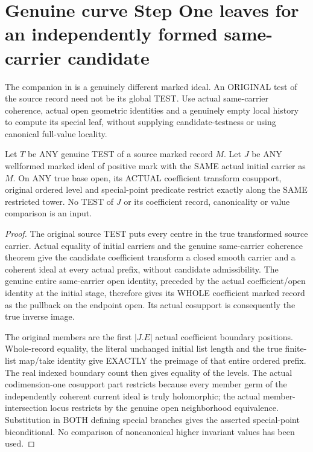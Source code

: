 \section{Genuine curve Step One leaves for an independently formed same-carrier candidate}

The companion in \cite[Section~5, Step~II.B]{bierstone-milman08-functoriality}
is a genuinely different marked ideal. An ORIGINAL test of the source
record need not be its global TEST. Use actual same-carrier coherence,
actual open geometric identities and a genuinely empty local history to
compute its special leaf, without supplying candidate-testness or using
canonical full-value locality.

\begin{lemma}
\label{hir:original-same-carrier-coefficient-special-open-geometry}
\leanok
Let $T$ be ANY genuine TEST of a source marked record $M$. Let $J$ be
ANY wellformed marked ideal of positive mark with the SAME actual initial
carrier as $M$. On ANY true base open, its ACTUAL coefficient transform
cosupport, original ordered level and special-point predicate restrict
exactly along the SAME restricted tower. No TEST of $J$ or its coefficient
record, canonicality or value comparison is an input.
\end{lemma}
\begin{proof}
The original source TEST puts every centre in the true transformed source
carrier. Actual equality of initial carriers and the genuine same-carrier
coherence theorem give the candidate coefficient transform a closed smooth
carrier and a coherent ideal at every actual prefix, without candidate
admissibility. The genuine entire same-carrier open identity, preceded by
the actual coefficient/open identity at the initial stage, therefore gives
its WHOLE coefficient marked record as the pullback on the endpoint open.
Its actual cosupport is consequently the true inverse image.

The original members are the first $|J.E|$ actual coefficient boundary
positions. Whole-record equality, the literal unchanged initial list
length and the true finite-list map/take identity give EXACTLY the
preimage of that entire ordered prefix. The real indexed boundary count
then gives equality of the levels. The actual codimension-one cosupport
part restricts because every member germ of the independently coherent
current ideal is truly holomorphic; the actual member-intersection locus
restricts by the genuine open neighborhood equivalence. Substitution in
BOTH defining special branches gives the asserted special-point
biconditional. No comparison of noncanonical higher invariant values has
been used.
\end{proof}

